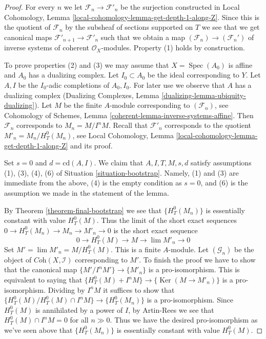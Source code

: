 \documentclass{stacks-project}
\theoremstyle{plain}
\theoremstyle{definition}
\theoremstyle{remark}
\numberwithin{equation}{subsection}
\def\lim{\mathop{\mathrm{lim}}\nolimits}
\def\Spec{\mathop{\mathrm{Spec}}}
\def\Ker{\mathop{\mathrm{Ker}}}
\begin{document}
\begin{proof}
For every $n$ we let $\mathcal{F}_n \to \mathcal{F}'_n$ be the surjection
constructed in
Local Cohomology, Lemma \ref{local-cohomology-lemma-get-depth-1-along-Z}.
Since this is the quotient of $\mathcal{F}_n$ by the subsheaf
of sections supported on $T$ we see that we get canonical maps
$\mathcal{F}'_{n + 1} \to \mathcal{F}'_n$ such that we obtain
a map $(\mathcal{F}_n) \to (\mathcal{F}_n')$
of inverse systems of coherent $\mathcal{O}_X$-modules.
Property (1) holds by construction.

\medskip\noindent
To prove properties (2) and (3) we may assume that $X = \Spec(A_0)$ is
affine and $A_0$ has a dualizing complex. Let $I_0 \subset A_0$ be the
ideal corresponding to $Y$. Let $A, I$ be the $I_0$-adic completions of
$A_0, I_0$. For later use we observe that $A$ has a dualizing complex
(Dualizing Complexes, Lemma \ref{dualizing-lemma-ubiquity-dualizing}).
Let $M$ be the finite $A$-module corresponding to $(\mathcal{F}_n)$, see
Cohomology of Schemes, Lemma \ref{coherent-lemma-inverse-systems-affine}.
Then $\mathcal{F}_n$ corresponds to $M_n = M/I^nM$. Recall that
$\mathcal{F}'_n$ corresponds to the quotient $M'_n = M_n / H^0_T(M_n)$,
see Local Cohomology, Lemma \ref{local-cohomology-lemma-get-depth-1-along-Z}
and its proof.

\medskip\noindent
Set $s = 0$ and $d = \text{cd}(A, I)$.
We claim that $A, I, T, M, s, d$ satisfy assumptions (1), (3), (4), (6)
of Situation \ref{situation-bootstrap}.
Namely, (1) and (3) are immediate from the above, (4) is
the empty condition as $s = 0$, and (6) is the assumption
we made in the statement of the lemma.

\medskip\noindent
By Theorem \ref{theorem-final-bootstrap} we see that $\{H^0_T(M_n)\}$
is essentially constant with value $H^0_T(M)$. Thus the limit of the
short exact sequences $0 \to H^0_T(M_n) \to M_n \to M'_n \to 0$
is the short exact sequence
$$
0 \to H^0_T(M) \to M \to \lim M'_n \to 0
$$
Set $M' = \lim M'_n = M/H^0_T(M)$. This is a finite $A$-module.
Let $(\mathcal{G}_n)$ be the object of $\textit{Coh}(X, \mathcal{I})$
corresponding to $M'$. To finish the proof we have to show that the
canonical map $\{M'/I^nM'\} \to \{M'_n\}$ is a pro-isomorphism.
This is equivalent to saying that
$\{H^0_T(M) + I^nM\} \to \{\Ker(M \to M'_n)\}$ is a
pro-isomorphism. Dividing by $I^nM$ it suffices to show that
$\{H^0_T(M)/H^0_T(M) \cap I^nM\} \to \{H^0_T(M_n)\}$
is a pro-isomorphism. Since $H^0_T(M)$ is annihilated by a power
of $I$, by Artin-Rees we see that $H^0_T(M) \cap I^nM = 0$
for all $n \gg 0$. Thus we have the desired pro-isomorphism
as we've seen above that $\{H^0_T(M_n)\}$
is essentially constant with value $H^0_T(M)$.
\end{proof}
\end{document}
